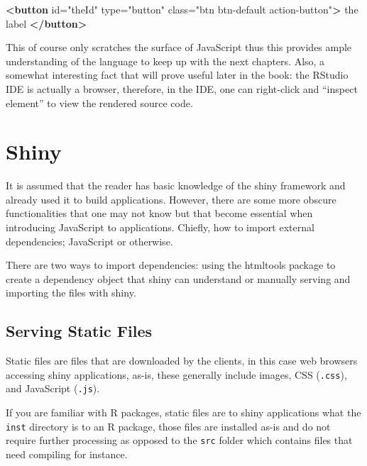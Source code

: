 \documentclass[
]{krantz}
\makeatletter
\newenvironment{Shaded}{\begin{snugshade}}{\end{snugshade}}
\newcommand{\KeywordTok}[1]{\textcolor[rgb]{0.27,0.27,0.27}{\textbf{#1}}}
\newcommand{\NormalTok}[1]{#1}
\newcommand{\OtherTok}[1]{\textcolor[rgb]{0.37,0.37,0.37}{#1}}
\newcommand{\StringTok}[1]{\textcolor[rgb]{0.5,0.5,0.5}{#1}}
\newenvironment{kframe}{%
\medskip{}
\setlength{\fboxsep}{.8em}
 \def\at@end@of@kframe{}%
 \ifinner\ifhmode%
  \def\at@end@of@kframe{\end{minipage}}%
  \begin{minipage}{\columnwidth}%
 \fi\fi%
 \def\FrameCommand##1{\hskip\@totalleftmargin \hskip-\fboxsep
 \colorbox{shadecolor}{##1}\hskip-\fboxsep
     \hskip-\linewidth \hskip-\@totalleftmargin \hskip\columnwidth}%
 \MakeFramed {\advance\hsize-\width
   \@totalleftmargin\z@ \linewidth\hsize
   \@setminipage}}%
 {\par\unskip\endMakeFramed%
 \at@end@of@kframe}
\renewenvironment{Shaded}{\begin{kframe}}{\end{kframe}}
\makeatother
\begin{document}
\begin{Shaded}
\begin{Highlighting}[]
\KeywordTok{<button} 
\OtherTok{  id=}\StringTok{"theId"} 
\OtherTok{  type=}\StringTok{"button"} 
\OtherTok{  class=}\StringTok{"btn btn{-}default action{-}button"}\KeywordTok{>}
\NormalTok{  the label}
\KeywordTok{</button>}
\end{Highlighting}
\end{Shaded}

This of course only scratches the surface of JavaScript thus this provides ample understanding of the language to keep up with the next chapters. Also, a somewhat interesting fact that will prove useful later in the book: the RStudio IDE is actually a browser, therefore, in the IDE, one can right-click and ``inspect element'' to view the rendered source code.

\hypertarget{basics-shiny}{%
\section{Shiny}\label{basics-shiny}}

It is assumed that the reader has basic knowledge of the shiny framework and already used it to build applications. However, there are some more obscure functionalities that one may not know but that become essential when introducing JavaScript to applications. Chiefly, how to import external dependencies; JavaScript or otherwise.

There are two ways to import dependencies: using the htmltools \citep{R-htmltools} package to create a dependency object that shiny can understand or manually serving and importing the files with shiny.

\hypertarget{basics-static-files}{%
\subsection{Serving Static Files}\label{basics-static-files}}

Static files are files that are downloaded by the clients, in this case web browsers accessing shiny applications, as-is, these generally include images, CSS (\texttt{.css}), and JavaScript (\texttt{.js}).

If you are familiar with R packages, static files are to shiny applications what the \texttt{inst} directory is to an R package, those files are installed as-is and do not require further processing as opposed to the \texttt{src} folder which contains files that need compiling for instance.
\end{document}
